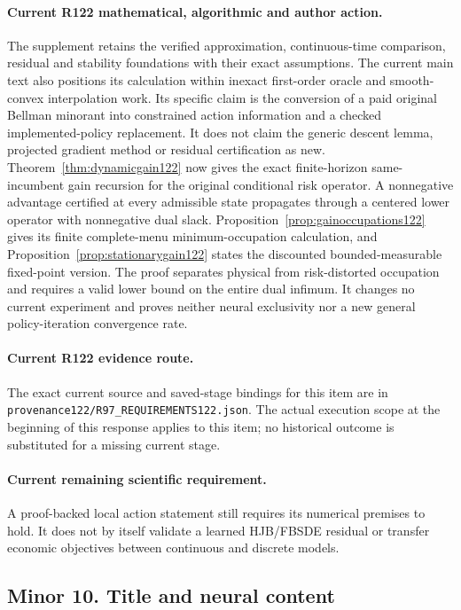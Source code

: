 \paragraph{Current R122 mathematical, algorithmic and author action.}
The supplement retains the verified approximation, continuous-time comparison, residual and stability foundations with their exact assumptions. The current main text also positions its calculation within inexact first-order oracle and smooth-convex interpolation work. Its specific claim is the conversion of a paid original Bellman minorant into constrained action information and a checked implemented-policy replacement. It does not claim the generic descent lemma, projected gradient method or residual certification as new. Theorem~\ref{thm:dynamicgain122} now gives the exact finite-horizon same-incumbent gain recursion for the original conditional risk operator. A nonnegative advantage certified at every admissible state propagates through a centered lower operator with nonnegative dual slack. Proposition~\ref{prop:gainoccupations122} gives its finite complete-menu minimum-occupation calculation, and Proposition~\ref{prop:stationarygain122} states the discounted bounded-measurable fixed-point version. The proof separates physical from risk-distorted occupation and requires a valid lower bound on the entire dual infimum. It changes no current experiment and proves neither neural exclusivity nor a new general policy-iteration convergence rate.
\paragraph{Current R122 evidence route.}
The exact current source and saved-stage bindings for this item are in \nolinkurl{provenance122/R97_REQUIREMENTS122.json}. The actual execution scope at the beginning of this response applies to this item; no historical outcome is substituted for a missing current stage.
\paragraph{Current remaining scientific requirement.}
A proof-backed local action statement still requires its numerical premises to hold. It does not by itself validate a learned HJB/FBSDE residual or transfer economic objectives between continuous and discrete models.

\subsection{Minor 10. Title and neural content}
\label{response122:minor-10}

